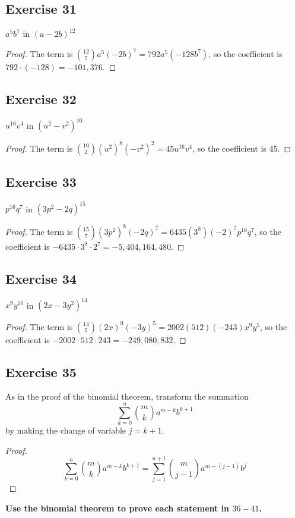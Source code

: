 \documentclass[14pt]{extarticle}
\newcommand{\dps}{\displaystyle}
\newcommand{\cy}{\color{cyan}}
\begin{document}
\subsection{Exercise 31}
\(a^5b^7\) in \((a-2b)^{12}\)
\begin{proof}
The term is \(\dps \binom{12}{7}a^5(-2b)^7 = 792a^5(-128b^7)\), so the coefficient is \(792 \cdot (-128) = -101,376\).
\end{proof}

\subsection{Exercise 32}
\(u^{16}v^4\) in \((u^2-v^2)^{10}\)
\begin{proof}
The term is \(\dps \binom{10}{2}(u^2)^8(-v^2)^2 = 45u^{16}v^4\), so the coefficient is 45.
\end{proof}

\subsection{Exercise 33}
\(p^{16}q^7\) in \((3p^2-2q)^{15}\)
\begin{proof}
The term is \(\dps \binom{15}{7}(3p^2)^8(-2q)^7 = 6435(3^8)(-2)^7p^{16}q^7\), so the coefficient is \(-6435 \cdot 3^8 
\cdot 2^7 = -5,404,164,480\).
\end{proof}

\subsection{Exercise 34}
\(x^9y^{10}\) in \((2x-3y^2)^{14}\)
\begin{proof}
The term is \(\binom{14}{5}(2x)^9(-3y)^5 = 2002(512)(-243)x^9y^5\), so the coefficient is \(-2002 \cdot 512 \cdot 
243 = -249,080,832\).
\end{proof}

\subsection{Exercise 35}
As in the proof of the binomial theorem, transform the summation
\[
\sum_{k=0}^{n}\binom{m}{k}a^{m-k}b^{k+1}
\]
by making the change of variable \(j = k + 1\).
\begin{proof}
\[
\sum_{k=0}^{n}\binom{m}{k}a^{m-k}b^{k+1} = \sum_{j=1}^{n+1}\binom{m}{j-1}a^{m-(j-1)}b^j
\]
\end{proof}

{\bf \cy Use the binomial theorem to prove each statement in \(36-41\).}
\end{document}
